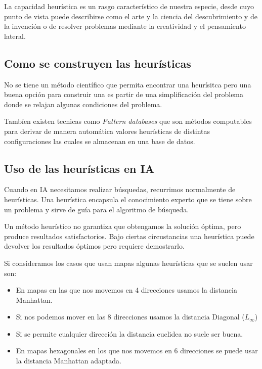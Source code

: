 \documentclass[12pt]{article}
\begin{document}
La capacidad heurística es un rasgo característico de nuestra especie,
desde cuyo punto de vista puede describirse como el arte y la ciencia
del descubrimiento y de la invención o de resolver problemas mediante
la creatividad y el pensamiento lateral.

\subsection{Como se construyen las heurísticas}

No se tiene un método científico que permita encontrar
una heurísitca pero una buena opción para construir una es partir de
una simplificación del problema donde se relajan algunas condiciones
del problema.

Tambíen existen tecnicas como \textit{Pattern databases} que son
métodos computables para derivar de manera automática valores
heurísticas de distintas configuraciones las cuales se almacenan en
una base de datos.

\subsection{Uso de las heurísticas en IA}

Cuando en IA necesitamos realizar búsquedas, recurrimos normalmente
de heurísticas. Una heurística encapsula el conocimiento experto que
se tiene sobre un problema y sirve de guía para el algoritmo de
búsqueda.

Un método heurístico no garantiza que obtengamos la solución óptima,
pero produce resultados satisfactorios. Bajo ciertas circustancias una
heurística puede devolver los resultados óptimos pero requiere
demostrarlo.

Si consideramos los casos que usan mapas algunas heurísticas que se
suelen usar son:

\begin{itemize}
\item En mapas en las que nos movemos en 4 direcciones usamos la
  distancia Manhattan.
\item Si nos podemos mover en las 8 direcciones usamos la distancia Diagonal ($L_\infty$)
\item Si se permite cualquier dirección la distancia euclidea no suele ser buena.
\item En mapas hexagonales en los que nos movemos en 6 direcciones se
  puede usar la distancia Manhattan adaptada.
\end{itemize}
\end{document}
